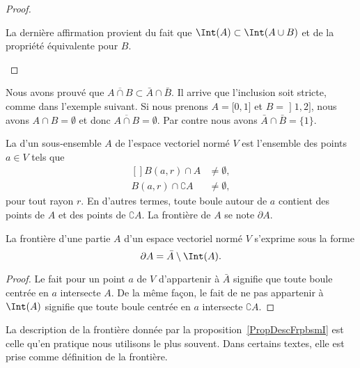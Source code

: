 \begin{proof}
\begin{enumerate}
		      La dernière affirmation provient du fait que $\Int(A)\subset\Int(A\cup B)$ et de la propriété équivalente pour $B$.
	\end{enumerate}
\end{proof}

\begin{remark}
	Nous avons prouvé que $\overline{ A\cap B }\subset\bar A\cap\bar B$. Il arrive que l'inclusion soit stricte, comme dans l'exemple suivant. Si nous prenons $A=\mathopen[ 0 , 1 \mathclose]$ et $B=\mathopen] 1 , 2 \mathclose]$, nous avons $A\cap B=\emptyset$ et donc $\overline{ A\cap B }=\emptyset$. Par contre nous avons $\bar A\cap\bar B=\{ 1 \}$.
\end{remark}

\begin{definition}
	La  d'un sous-ensemble $A$ de l'espace vectoriel normé $V$ est l'ensemble des points $a\in V$ tels que
	\begin{equation}
		\begin{aligned}[]
			B(a,r)\cap A             & \neq \emptyset, \\
			B(a,r)\cap \complement A & \neq \emptyset,
		\end{aligned}
	\end{equation}
	pour tout rayon $r$. En d'autres termes, toute boule autour de $a$ contient des points de $A$ et des points de $\complement A$. La frontière de $A$ se note $\partial A$.
\end{definition}

\begin{proposition}		\label{PropDescFrpbsmI}
	La frontière d'une partie $A$ d'un espace vectoriel normé $V$ s'exprime sous la forme
	\begin{equation}
		\partial A=\bar A\setminus\Int(A).
	\end{equation}
\end{proposition}

\begin{proof}
	Le fait pour un point $a$ de $V$ d'appartenir à $\bar A$ signifie que toute boule centrée en $a$ intersecte $A$. De la même façon, le fait de ne pas appartenir à $\Int(A)$ signifie que toute boule centrée en $a$ intersecte $\complement A$.
\end{proof}

La description de la frontière donnée par la proposition~\ref{PropDescFrpbsmI} est celle qu'en pratique nous utilisons le plus souvent. Dans certains textes, elle est prise comme définition de la frontière.

